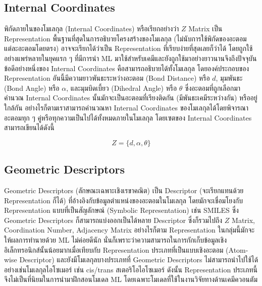 \subsection{Internal Coordinates}
\label{ssec:internal_coord}

พิกัดภายในของโมเลกุล (Internal Coordinates) หรือเรียกอย่างว่า $Z$ Matrix เป็น Representation พื้นฐานที่สุดในการอธิบายโครงสร้างของโมเลกุล (ไม่นับการใช้พิกัดของอะตอมแต่ละอะตอมโดยตรง) อาจจะเรียกได้ว่าเป็น Representation ที่เรียบง่ายที่สุดเลยก็ว่าได้ โดยถูกใช้อย่างแพร่หลายในยุคแรก ๆ ที่มีการนำ ML มาใช้สำหรับเคมีและยังถูกใช้มาอย่างยาวนานจึงถึงปัจจุบัน ข้อดีอย่างหนึ่งของ Internal Coordinates คือสามารถอธิบายได้ทั้งโมเลกุล โดยองค์ประกอบของ Representation อันนี้มีความยาวพันธะระหว่างอะตอม (Bond Distance) หรือ $d$, มุมพันธะ (Bond Angle) หรือ $\alpha$, และมุมบิดเบี้ยว (Dihedral Angle) หรือ $\theta$ ซึ่งอะตอมที่ถูกเลือกมาคำนวณ Internal Coordinates นั้นมักจะเป็นอะตอมที่เรียงติดกัน (มีพันธะเคมีระหว่างกัน) หรืออยู่ใกล้กัน อย่างไรก็ตามเราสามารถคำนวณหา Internal Coordinates ของโมเลกุลได้โดยพิจารณาอะตอมทุก ๆ คู่หรือทุกความเป็นไปได้ทั้งหมดภายในโมเลกุล โดยเซตของ Internal Coordinates สามารถเขียนได้ดังนี้

\begin{equation}\label{eq:internal_coord}
    Z = \{ d, \alpha, \theta \}
\end{equation}

\subsection{Geometric Descriptors}
\label{ssec:geom_descriptor}

Geometric Descriptors (ลักษณะเฉพาะเชิงเรขาคณิต) เป็น Descriptor (จะเรียกแทนด้วย Representation ก็ได้) ที่อ้างอิงกับข้อมูลตำแหน่งของอะตอมในโมเลกุล โดยมักจะเชื่อมโยงกับ Representation แบบที่เป็นสัญลักษณ์ (Symbolic Representation) เช่น SMILES ซึ่ง Geometric Descriptors ก็สามารถแบ่งออกเป็นได้หลาย Descriptor ซึ่งก็รวมไปถึง $Z$ Matrix, Coordination Number, Adjacency Matrix อย่างไรก็ตาม Representation ในกลุ่มนี้มักจะให้ผลการทำนายด้วย ML ไม่ค่อยดีนัก นั่นก็เพราะว่าความสามารถในการกักเก็บข้อมูลเชิงอิเล็กทรอนิกส์นั้นน้อยมากเมื่อเทียบกับ Representation ประเภทที่เป็นแบบเชิงอะตอม (Atom-wise Descriptor) และยังมีโมเลกุลบางประเภทที่ Geometric Descriptors ไม่สามารถนำไปใช้ได้ อย่างเช่นโมเลกุลไอโซเมอร์ เช่น cis/trans สเตอริโอไอโซเมอร์ ดังนั้น Representation ประเภทนี้จึงไม่เป็นที่นิยมในการนำมาฝึกสอนโมเดล ML โดยเฉพาะโมเดลที่ใช้ในงานวิจัยทางด้านเคมีควอนตัม\autocite{keith2021,musil2021}


